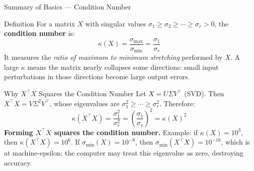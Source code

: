 \documentclass{beamer}
\begin{document}
\begin{frame}[shrink=10]{Summary of Basics --- Condition Number}
  \begin{block}{Definition}
    For a matrix $X$ with singular values
    $\sigma_1 \geq \sigma_2 \geq \cdots \geq \sigma_r > 0$, the
    \textbf{condition number} is:
    \[
      \kappa(X)
        = \frac{\sigma_{\max}}{\sigma_{\min}}
        = \frac{\sigma_1}{\sigma_r}
    \]
    It measures the \emph{ratio of maximum to minimum stretching}
    performed by $X$.
    A large $\kappa$ means the matrix nearly collapses some directions:
    small input perturbations in those directions become large output errors.
  \end{block}

  \begin{block}{Why $X^\top X$ Squares the Condition Number}
    Let $X = U\Sigma V^\top$ (SVD).
    Then $X^\top X = V\Sigma^2 V^\top$, whose eigenvalues are
    $\sigma_1^2 \geq \cdots \geq \sigma_r^2$.
    Therefore:
    \[
      \kappa(X^\top X)
        = \frac{\sigma_1^2}{\sigma_r^2}
        = \left(\frac{\sigma_1}{\sigma_r}\right)^{\!2}
        = \kappa(X)^2
    \]
    \textbf{Forming $X^\top X$ squares the condition number.}
    Example: if $\kappa(X) = 10^3$, then $\kappa(X^\top X) = 10^6$.
    If $\sigma_{\min}(X) = 10^{-8}$, then
    $\sigma_{\min}(X^\top X) = 10^{-16}$, which is at machine-epsilon:
    the computer may treat this eigenvalue as zero, destroying accuracy.
  \end{block}
\end{frame}
\end{document}
